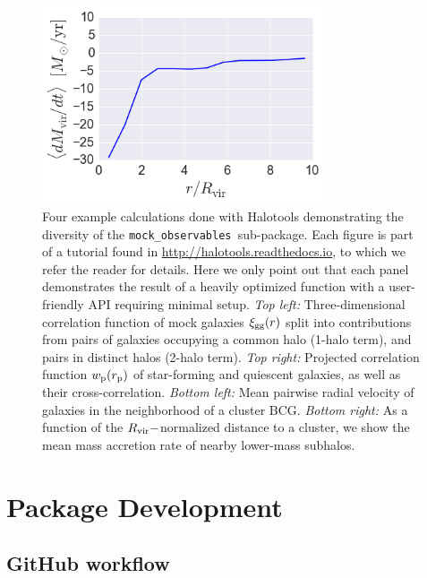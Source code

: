 \documentclass[twocolumn, tighten]{aastex6}
\newcommand{\rproj}{r_{\rm p}}
\newcommand{\mockobs}{{\tt mock\_observables }}
\begin{document}
\begin{figure}
\begin{center}
\includegraphics[width=8.3cm]{./FIGS/radial_profile_halocat_tutorial_fig1.png}
\caption{
Four example calculations done with Halotools demonstrating the diversity of the \mockobs sub-package. Each figure is part of a tutorial found in \url{http://halotools.readthedocs.io}, to which we refer the reader for details. Here we only point out that each panel demonstrates the result of a heavily optimized function with a user-friendly API requiring minimal setup. {\em Top left:} Three-dimensional correlation function of mock galaxies $\xi_{\rm gg}(r)$ split into contributions from pairs of galaxies occupying a common halo (1-halo term), and pairs in distinct halos (2-halo term). {\em Top right:} Projected correlation function $w_{\rm p}(\rproj)$ of star-forming and quiescent galaxies, as well as their cross-correlation. {\em Bottom left:} Mean pairwise radial velocity of galaxies in the neighborhood of a cluster BCG. {\em Bottom right:} As a function of the $R_{\rm vir}-$normalized distance to a cluster, we show the mean mass accretion rate of nearby lower-mass subhalos. 
}
\label{fig:mockobs}
\end{center}
\end{figure}

\section{Package Development}
\label{section:development}

\subsection{GitHub workflow}
\label{subsection:githubworkflow}
\end{document}
